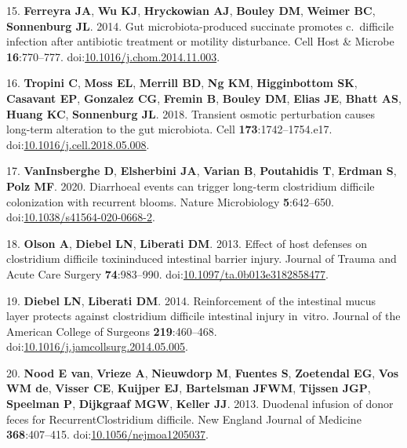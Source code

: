 \documentclass[
  11pt,
]{article}
\begin{document}
\leavevmode\hypertarget{ref-Ferreyra2014}{}%
15. \textbf{Ferreyra JA}, \textbf{Wu KJ}, \textbf{Hryckowian AJ},
\textbf{Bouley DM}, \textbf{Weimer BC}, \textbf{Sonnenburg JL}. 2014.
Gut microbiota-produced succinate promotes c.~difficile infection after
antibiotic treatment or motility disturbance. Cell Host \& Microbe
\textbf{16}:770--777.
doi:\href{https://doi.org/10.1016/j.chom.2014.11.003}{10.1016/j.chom.2014.11.003}.

\leavevmode\hypertarget{ref-Tropini2018}{}%
16. \textbf{Tropini C}, \textbf{Moss EL}, \textbf{Merrill BD},
\textbf{Ng KM}, \textbf{Higginbottom SK}, \textbf{Casavant EP},
\textbf{Gonzalez CG}, \textbf{Fremin B}, \textbf{Bouley DM},
\textbf{Elias JE}, \textbf{Bhatt AS}, \textbf{Huang KC},
\textbf{Sonnenburg JL}. 2018. Transient osmotic perturbation causes
long-term alteration to the gut microbiota. Cell
\textbf{173}:1742--1754.e17.
doi:\href{https://doi.org/10.1016/j.cell.2018.05.008}{10.1016/j.cell.2018.05.008}.

\leavevmode\hypertarget{ref-VanInsberghe2020}{}%
17. \textbf{VanInsberghe D}, \textbf{Elsherbini JA}, \textbf{Varian B},
\textbf{Poutahidis T}, \textbf{Erdman S}, \textbf{Polz MF}. 2020.
Diarrhoeal events can trigger long-term clostridium difficile
colonization with recurrent blooms. Nature Microbiology
\textbf{5}:642--650.
doi:\href{https://doi.org/10.1038/s41564-020-0668-2}{10.1038/s41564-020-0668-2}.

\leavevmode\hypertarget{ref-Olson2013}{}%
18. \textbf{Olson A}, \textbf{Diebel LN}, \textbf{Liberati DM}. 2013.
Effect of host defenses on clostridium difficile toxininduced intestinal
barrier injury. Journal of Trauma and Acute Care Surgery
\textbf{74}:983--990.
doi:\href{https://doi.org/10.1097/ta.0b013e3182858477}{10.1097/ta.0b013e3182858477}.

\leavevmode\hypertarget{ref-Diebel2014}{}%
19. \textbf{Diebel LN}, \textbf{Liberati DM}. 2014. Reinforcement of the
intestinal mucus layer protects against clostridium difficile intestinal
injury in~vitro. Journal of the American College of Surgeons
\textbf{219}:460--468.
doi:\href{https://doi.org/10.1016/j.jamcollsurg.2014.05.005}{10.1016/j.jamcollsurg.2014.05.005}.

\leavevmode\hypertarget{ref-vanNood2013}{}%
20. \textbf{Nood E van}, \textbf{Vrieze A}, \textbf{Nieuwdorp M},
\textbf{Fuentes S}, \textbf{Zoetendal EG}, \textbf{Vos WM de},
\textbf{Visser CE}, \textbf{Kuijper EJ}, \textbf{Bartelsman JFWM},
\textbf{Tijssen JGP}, \textbf{Speelman P}, \textbf{Dijkgraaf MGW},
\textbf{Keller JJ}. 2013. Duodenal infusion of donor feces for
RecurrentClostridium difficile. New England Journal of Medicine
\textbf{368}:407--415.
doi:\href{https://doi.org/10.1056/nejmoa1205037}{10.1056/nejmoa1205037}.
\end{document}
